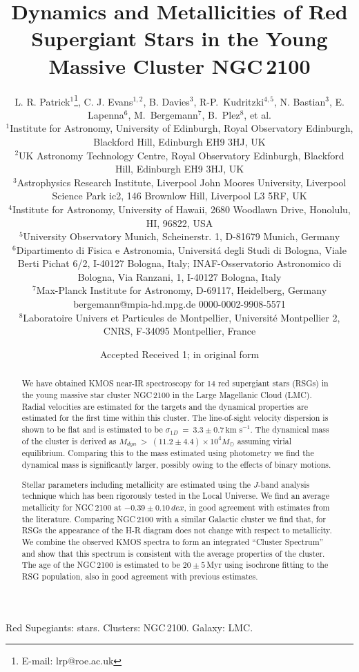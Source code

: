 \documentclass[useAMS,usenatbib]{mn2e}
\title[Dynamics and Metallicities in NGC\,2100]{Dynamics and Metallicities of Red Supergiant Stars in the Young Massive Cluster NGC\,2100}
\author[L. R. Patrick et al.]{L. R. Patrick$^{1}$\thanks{E-mail: lrp@roe.ac.uk},
C. J. Evans$^{1, 2}$,
B. Davies$^{3}$,
R-P.~Kudritzki$^{4,5}$,
N. Bastian$^{3}$,
E. Lapenna$^{6}$,
M.~Bergemann$^{7}$,
B.~Plez$^{8}$,
et al.\\
$^{1}$Institute for Astronomy, University of Edinburgh, Royal Observatory Edinburgh, Blackford Hill, Edinburgh EH9 3HJ, UK\\
$^{2}$UK Astronomy Technology Centre, Royal Observatory Edinburgh, Blackford Hill, Edinburgh EH9 3HJ, UK\\
$^{3}$Astrophysics Research Institute, Liverpool John Moores University, Liverpool Science Park ic2, 146 Brownlow Hill, Liverpool L3 5RF, UK\\
$^{4}$Institute for Astronomy, University of Hawaii, 2680 Woodlawn Drive, Honolulu, HI, 96822, USA\\
$^{5}$University Observatory Munich, Scheinerstr. 1, D-81679 Munich, Germany\\
$^{6}$Dipartimento di Fisica e Astronomia, Universit\'a degli Studi di Bologna, Viale Berti Pichat 6/2, I-40127 Bologna, Italy; INAF-Osservatorio Astronomico di Bologna, Via Ranzani, 1, I-40127 Bologna, Italy\\
$^{7}$Max-Planck Institute for Astronomy, D-69117, Heidelberg, Germany bergemann@mpia-hd.mpg.de 0000-0002-9908-5571\\
$^{8}$Laboratoire Univers et Particules de Montpellier, Universit\'e Montpellier 2, CNRS, F-34095 Montpellier, France\\
}
\def\kms{$\mbox{km s}^{-1}$}
\begin{document}
\date{Accepted  Received 1; in original form}

\pagerange{\pageref{firstpage}--\pageref{lastpage}} 

\maketitle

\label{firstpage}

\begin{abstract}
We have obtained KMOS near-IR spectroscopy for 14 red supergiant stars (RSGs) in the young massive star cluster NGC\,2100 in the Large Magellanic Cloud (LMC).
Radial velocities are estimated for the targets and the dynamical properties are estimated for the first time within this cluster.
The line-of-sight velocity dispersion is shown to be flat and is estimated to be
$\sigma_{1D}~=~3.3\pm0.7\,$\kms.
The dynamical mass of the cluster is derived as
$M_{dyn}~>~(11.2\pm4.4)\times10^{4}M_{\odot}$ assuming virial equilibrium.
Comparing this to the mass estimated using photometry we find the dynamical mass is significantly larger, possibly owing to the effects of binary motions.

Stellar parameters including metallicity are estimated using the $J$-band analysis technique which has been rigorously tested in the Local Universe.
We find an average metallicity for NGC\,2100 at $-0.39\pm0.10\,dex$, in good agreement with estimates from the literature.
Comparing NGC\,2100 with a similar Galactic cluster we find that, for RSGs the appearance of the H-R diagram does not change with respect to metallicity.
We combine the observed KMOS spectra to form an integrated ``Cluster Spectrum'' and show that this spectrum is consistent with the average properties of the cluster.
The age of the NGC\,2100 is estimated to be $20\pm5\,$Myr using isochrone fitting to the RSG population, also in good agreement with previous estimates.

\end{abstract}

\begin{keywords}
Red Supegiants: stars. Clusters: NGC\,2100. Galaxy: LMC.
\end{keywords}
\end{document}
